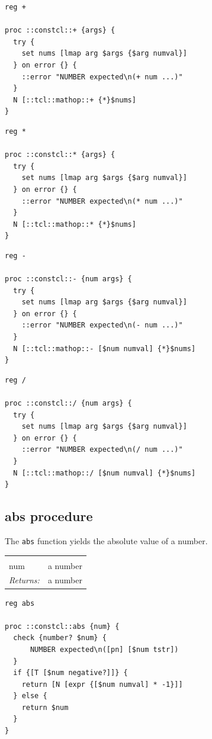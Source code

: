 \documentclass[a5paper,draft]{memoir}
\begin{document}
\begin{lstlisting}
reg +

proc ::constcl::+ {args} {
  try {
    set nums [lmap arg $args {$arg numval}]
  } on error {} {
    ::error "NUMBER expected\n(+ num ...)"
  }
  N [::tcl::mathop::+ {*}$nums]
}
\end{lstlisting}

\begin{lstlisting}
reg *

proc ::constcl::* {args} {
  try {
    set nums [lmap arg $args {$arg numval}]
  } on error {} {
    ::error "NUMBER expected\n(* num ...)"
  }
  N [::tcl::mathop::* {*}$nums]
}
\end{lstlisting}

\begin{lstlisting}
reg -

proc ::constcl::- {num args} {
  try {
    set nums [lmap arg $args {$arg numval}]
  } on error {} {
    ::error "NUMBER expected\n(- num ...)"
  }
  N [::tcl::mathop::- [$num numval] {*}$nums]
}
\end{lstlisting}

\begin{lstlisting}
reg /

proc ::constcl::/ {num args} {
  try {
    set nums [lmap arg $args {$arg numval}]
  } on error {} {
    ::error "NUMBER expected\n(/ num ...)"
  }
  N [::tcl::mathop::/ [$num numval] {*}$nums]
}
\end{lstlisting}

\subsection{abs procedure}
\label{abs-procedure}

The \texttt{abs} function yields the absolute value of a number.

\noindent\begin{tabular}{ |p{1.9cm} p{6.5cm}| }
\hline
\rowcolor[HTML]{CCCCCC} \multicolumn{2}{|l|}{\textbf{abs (public)}} \\
num & a number \\
\textit{Returns:} & a number \\
\hline
\end{tabular}

\begin{lstlisting}
reg abs

proc ::constcl::abs {num} {
  check {number? $num} {
      NUMBER expected\n([pn] [$num tstr])
  }
  if {[T [$num negative?]]} {
    return [N [expr {[$num numval] * -1}]]
  } else {
    return $num
  }
}
\end{lstlisting}
\end{document}
